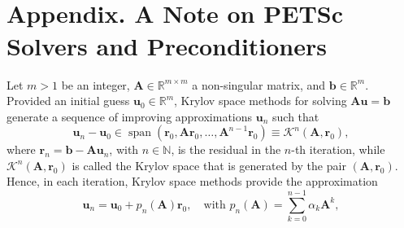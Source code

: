 \documentclass[9pt]{amsart}
\theoremstyle{remark}
\theoremstyle{definition}
\begin{document}
\section{\hrulefill\\Appendix. A Note on PETSc Solvers and Preconditioners}
Let $m>1$ be an integer, $\bm{A}\in\mathbb{R}^{m\times m}$ a non-singular matrix, and $\bm{b}\in\mathbb{R}^m$. Provided an initial guess $\bm{u}_0\in\mathbb{R}^m$, Krylov space methods for solving $\bm{Au}=\bm{b}$ generate a sequence of improving approximations $\bm{u}_n$ such that
\[
\bm{u}_n - \bm{u}_0\in\operatorname{span}(\bm{r}_0,\bm{Ar}_0,\ldots,\bm{A}^{n-1}\bm{r}_0)\equiv\mathcal{K}^n(\bm{A},\bm{r}_0),
\]
where $\bm{r}_n=\bm{b}-\bm{A}\bm{u}_n$, with $n\in\mathbb{N}$, is the residual in the $n$-th iteration, while $\mathcal{K}^n(\bm{A},\bm{r}_0)$ is called the Krylov space that is generated by the pair $(\bm{A},\bm{r}_0)$. Hence, in each iteration, Krylov space methods provide the approximation
\[
\bm{u}_n = \bm{u}_0 + p_n(\bm{A})\bm{r}_0,\quad\text{with }p_n(\bm{A})=\sum_{k=0}^{n-1}\alpha_k\bm{A}^k,
\]
\end{document}
